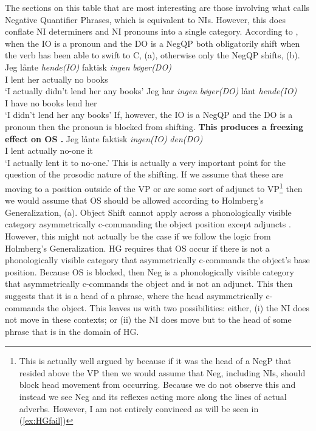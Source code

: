 \documentclass[12pt, letterpaper]{article}
\begin{document}
\ex The sections on this table that are most interesting are those involving what \citeauthor{christensenInterfacesNegationSyntax2005} calls Negative Quantifier Phrases, which is equivalent to NIs. However, this does conflate NI determiners and NI pronouns into a single category.
\ex According to \citeauthor{christensenInterfacesNegationSyntax2005}, when the IO is a pronoun and the DO is a NegQP both obligatorily shift when the verb has been able to swift to C, (a), otherwise only the NegQP shifts, (b).
	\ea 
	\gll Jeg lånte \textit{hende(IO)} faktisk \textit{ingen} \textit{bøger(DO)}\\
	I lent her actually no books\\
	\glt `I actually didn't lend her any books'
	\ex 
	\gll Jeg har \textit{ingen} \textit{bøger(DO)} lånt \textit{hende(IO)}\\
	I have no books lend her\\
	\glt `I didn't lend her any books'
	\z 
\ex If, however, the IO is a NegQP and the DO is a pronoun then the pronoun is blocked from shifting. \textbf{This produces a freezing effect on OS \citep[164]{christensenInterfacesNegationSyntax2005}.}
	\ea 
	\gll Jeg lånte faktisk \textit{ingen(IO)} \textit{den(DO)}\\
	I lent actually no-one it\\
	\glt `I actually lent it to no-one.'
	\z
\ex This is actually a very important point for the question of the prosodic nature of the shifting. If we assume that these are moving to a position outside of the VP or are some sort of adjunct to VP\footnote{This is actually well argued by \citet{thrainssonSyntaxIcelandic2010} because if it was the head of a NegP that resided above the VP then we would assume that Neg, including NIs, should block head movement from occurring. Because we do not observe this and instead we see Neg and its reflexes acting more along the lines of actual adverbs. However, I am not entirely convinced as will be seen in (\ref{ex:HGfail})} then we would assume that OS should be allowed according to Holmberg's Generalization, (a). 
	\ea Object Shift cannot apply across a phonologically visible category asymmetrically c-commanding the object position except adjuncts \citep[15]{holmbergRemarksHolmbergGeneralization1999}.
	\z 
\ex \label{ex:HGfail} However, this might not actually be the case if we follow the logic from Holmberg's Generalization. HG requires that OS occur if there is not a phonologically visible category that asymmetrically c-commands the object's base position. Because OS is blocked, then Neg is a phonologically visible category that asymmetrically c-commands the object and is not an adjunct. This then suggests that it is a head of a phrase, where the head asymmetrically c-commands the object. This leaves us with two possibilities: either, (i) the NI does not move in these contexts; or (ii) the NI does move but to the head of some phrase that is in the domain of HG.
\end{document}
